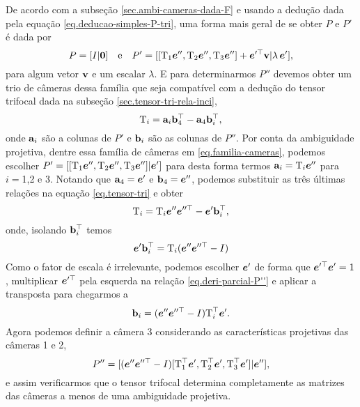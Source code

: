 De acordo com a subseção \ref{sec.ambi-cameras-dada-F} e usando a dedução dada pela equação \ref{eq.deducao-simples-P-tri}, uma forma mais geral de se obter $P$ e $P'$ é dada por
\begin{equation}\label{eq.familia-cameras}
P=[I|{\bf 0}]\quad\text{e}\quad P'=[[\mbox{T}_1\boldsymbol{e}'',\mbox{T}_2\boldsymbol{e}'',\mbox{T}_3\boldsymbol{e}'']+\boldsymbol{e}'^\top{\bf v} |\lambda\,\boldsymbol{e}'],
\end{equation}    
para algum vetor ${\bf v}$ e um escalar $\lambda$. E para determinarmos $P''$ devemos obter um trio de câmeras dessa família que seja compatível com a dedução do tensor trifocal dada na subseção \ref{sec.tensor-tri-rela-inci},
\begin{equation}\label{eq.tensor-tri}
\mbox{T}_i={\bf a}_i{\bf b}_4^\top-{\bf a}_4{\bf b}_i^\top,
\end{equation}
onde ${\bf a}_i$ são a colunas de $P'$ e ${\bf b}_i$ são as colunas de $P''$.
Por conta da ambiguidade projetiva, dentre essa família de câmeras em \ref{eq.familia-cameras}, podemos escolher $P'=[[\mbox{T}_1\boldsymbol{e}'',\mbox{T}_2\boldsymbol{e}'',\mbox{T}_3\boldsymbol{e}'']|\boldsymbol{e}']$ para desta forma termos ${\bf a}_i=\mbox{T}_i\boldsymbol{e}''$ para $i=$1,2 e 3. Notando que ${\bf a}_4=\boldsymbol{e}'$ e ${\bf b}_4=\boldsymbol{e}''$, podemos substituir as três últimas relações na equação \ref{eq.tensor-tri} e obter
\begin{equation*}
\mbox{T}_i=\mbox{T}_i\boldsymbol{e}''\boldsymbol{e}''^\top-\boldsymbol{e}'{\bf b}_i^\top,
\end{equation*}
onde, isolando ${\bf b}_i^\top$ temos 
\begin{equation}\label{eq.deri-parcial-P''}
\boldsymbol{e}'{\bf b}_i^\top=\mbox{T}_i (\boldsymbol{e}''\boldsymbol{e}''^\top-I)
\end{equation}
Como o fator de escala é irrelevante, podemos escolher $\boldsymbol{e}'$ de forma que $\boldsymbol{e}'^\top\boldsymbol{e}'=1$, multiplicar $\boldsymbol{e}'^\top$ pela esquerda na relação \ref{eq.deri-parcial-P''} e aplicar a transposta para chegarmos a
\begin{equation*}
{\bf b}_i=(\boldsymbol{e}''\boldsymbol{e}''^\top -I)\mbox{T}_i^\top\boldsymbol{e}'.
\end{equation*}
Agora podemos definir a câmera 3 considerando as características projetivas das câmeras 1 e 2,
\begin{equation*}
P''=[(\boldsymbol{e}''\boldsymbol{e}''^\top -I)[\mbox{T}_1^\top\boldsymbol{e}',\mbox{T}_2^\top\boldsymbol{e}',\mbox{T}_3^\top\boldsymbol{e}']|\boldsymbol{e}''],
\end{equation*}
e assim verificarmos que o tensor trifocal determina completamente as matrizes das câmeras a menos de uma ambiguidade projetiva.

